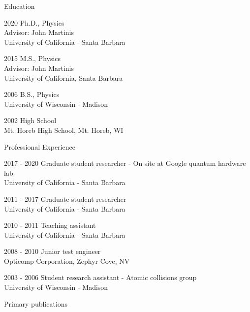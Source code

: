 \begin{vitae}
\begin{vitaesection}{Education}
\item [2020] Ph.D., Physics\\ Advisor: John Martinis \\ University of California - Santa Barbara
\item [2015] M.S., Physics\\ Advisor: John Martinis \\ University of California, Santa Barbara
\item [2006] B.S., Physics\\ University of Wisconsin - Madison
\item [2002] High School\\ Mt. Horeb High School, Mt. Horeb, WI
\end{vitaesection}

\begin{vitaesection}{Professional Experience}
\item [2017 - 2020] Graduate student researcher - On site at Google quantum hardware lab \\ University of California - Santa Barbara
\item [2011 - 2017] Graduate student researcher \\ University of California - Santa Barbara
\item [2010 - 2011] Teaching assistant \\University of California - Santa Barbara
\item [2008 - 2010] Junior test engineer \\ Opticomp Corporation,  Zephyr Cove, NV
\item [2003 - 2006] Student research assistant - Atomic collisions group \\ University of Wisconsin - Madison
\end{vitaesection}

\begin{vitaesectnodate}{Primary publications}

\end{vitaesectnodate}
\end{vitae}